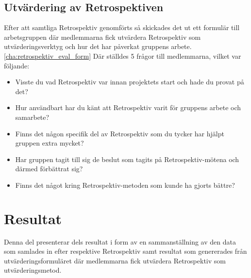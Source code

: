 \subsection{Utvärdering av Retrospektiven}
\label{sec:johan_n-evaluation-of-retrospectives}

Efter att samtliga Retrospektiv genomförts så skickades det ut ett formulär till arbetsgruppen där medlemmarna fick utvärdera Retrospektiv som utvärderingsverktyg och hur det har påverkat gruppens arbete.\ref{cha:retrospektiv_eval_form} Där ställdes 5 frågor till medlemmarna, vilket var följande:
\begin{itemize}
\item Visste du vad Retrospektiv var innan projektets start och hade du provat på det?
\item Hur användbart har du känt att Retrospektiv varit för gruppens arbete och samarbete?
\item Finns det någon specifik del av Retrospektiv som du tycker har hjälpt gruppen extra mycket?
\item Har gruppen tagit till sig de beslut som tagits på Retrospektiv-mötena och därmed förbättrat sig?
\item Finns det något kring Retrospektiv-metoden som kunde ha gjorts bättre?
\end{itemize}


\section{Resultat}
\label{cha:johan_n-results}

Denna del presenterar dels resultat i form av en sammanställning av den data som samlades in efter respektive Retrospektiv samt resultat som genererades från utvärderingsformuläret där medlemmarna fick utvärdera Retrospektiv som utvärderingsmetod.


